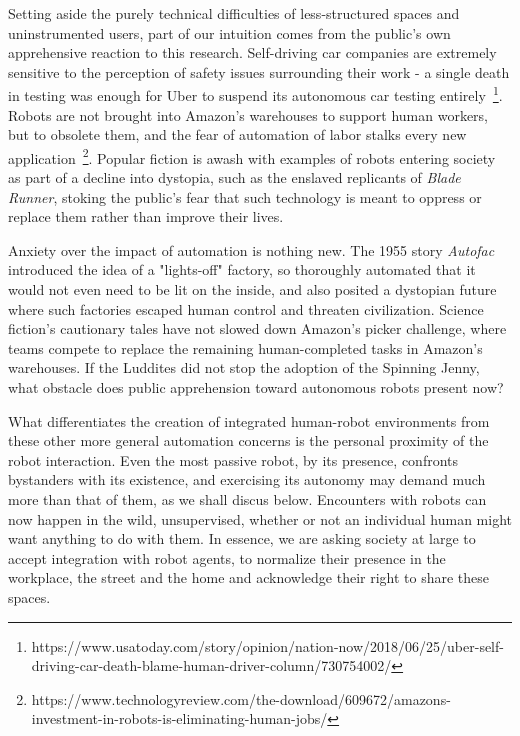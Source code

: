 \documentclass{sfuthesis}
\begin{document}
Setting aside the purely technical difficulties of less-structured spaces and uninstrumented users, part of our intuition comes from the public's own apprehensive reaction to this research. Self-driving car companies are extremely sensitive to the perception of safety issues surrounding their work - a single death in testing was enough for Uber to suspend its autonomous car testing entirely~\footnote{https://www.usatoday.com/story/opinion/nation-now/2018/06/25/uber-self-driving-car-death-blame-human-driver-column/730754002/}. Robots are not brought into Amazon's warehouses to support human workers, but to obsolete them, and the fear of automation of labor stalks every new application~\footnote{https://www.technologyreview.com/the-download/609672/amazons-investment-in-robots-is-eliminating-human-jobs/}. Popular fiction is awash with examples of robots entering society as part of a decline into dystopia, such as the enslaved replicants of \textit{Blade Runner}, stoking the public's fear that such technology is meant to oppress or replace them rather than improve their lives.





Anxiety over the impact of automation is nothing new. The 1955 story \textit{Autofac}~\cite{dick1955autofac} introduced the idea of a "lights-off" factory, so thoroughly automated that it would not even need to be lit on the inside, and also posited a dystopian future where such factories escaped human control and threaten civilization. Science fiction's cautionary tales have not slowed down Amazon's picker challenge, where teams compete to replace the remaining human-completed tasks in Amazon's warehouses. If the Luddites did not stop the adoption of the Spinning Jenny, what obstacle does public apprehension toward autonomous robots present now?

What differentiates the creation of integrated human-robot environments from these other more general automation concerns is the personal proximity of the robot interaction. Even the most passive robot, by its presence, confronts bystanders with its existence, and exercising its autonomy may demand much more than that of them, as we shall discus below. Encounters with robots can now happen in the wild, unsupervised, whether or not an individual human might want anything to do with them. In essence, we are asking society at large to accept integration with robot agents, to normalize their presence in the workplace, the street and the home and acknowledge their right to share these spaces.
\end{document}
